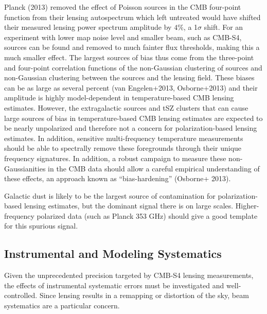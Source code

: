 Planck (2013) removed the effect of Poisson sources in the CMB four-point function from their lensing autospectrum which left untreated would have shifted their measured lensing power spectrum amplitude by $4\%$, a  1$\sigma$ shift.  For an experiment with lower map noise level and smaller beam, such as CMB-S4, sources can be found and removed to much fainter flux thresholds, making this
a much smaller effect.  The largest sources of bias thus come from the three-point and four-point correlation functions of the non-Gaussian clustering
of sources and non-Gaussian clustering between the sources and the lensing field.  These biases can be as large as several percent (van Engelen+2013, Osborne+2013) and their amplitude is highly model-dependent in temperature-based CMB lensing estimates. However, the extragalactic sources and tSZ clusters that can cause large sources of bias in temperature-based CMB lensing estimates are expected to be nearly unpolarized and therefore not a concern for polarization-based lensing estimates. In
addition, sensitive multi-frequency temperature measurements should be
able to spectrally remove these foregrounds through their unique frequency
signatures. In addition, a robust campaign to measure these non-Gaussianities
in the CMB data should allow a careful empirical understanding of these
effects, an approach known as ``bias-hardening'' (Osborne+ 2013).  

Galactic dust is likely to be the largest source of contamination for
polarization-based lensing estimates, but the dominant signal there
is on large scales.  Higher-frequency polarized data (such as Planck 353 GHz)
should give a good template for this spurious signal. %

\subsection{Instrumental and Modeling Systematics}\label{systInst}
 	
Given the unprecedented precision targeted by CMB-S4 lensing measurements, the effects of instrumental systematic errors must be investigated and well-controlled. Since lensing results in a remapping or distortion of the sky, beam systematics are a particular concern. 

